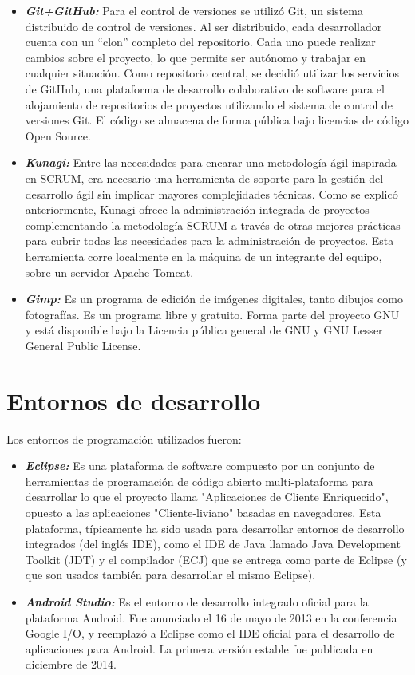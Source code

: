 \begin{itemize}
	\item \emph{\textbf{Git+GitHub:}} Para el control de versiones se utilizó Git, un sistema distribuido de control de versiones. Al ser distribuido,   cada desarrollador cuenta con un “clon” completo del repositorio. Cada uno puede realizar cambios sobre el proyecto, lo que permite ser autónomo y trabajar en cualquier situación. Como repositorio central, se decidió utilizar los servicios de GitHub, una plataforma de desarrollo colaborativo de software para el alojamiento de repositorios de proyectos   utilizando el sistema de control de versiones Git. El código se   almacena de forma pública bajo licencias de código Open   Source.  
	\item \emph{\textbf{Kunagi:}} Entre las necesidades para encarar una metodología ágil inspirada en SCRUM, era necesario una herramienta de   soporte para la gestión del desarrollo ágil sin implicar mayores complejidades técnicas. Como se explicó anteriormente,  Kunagi ofrece la administración integrada de proyectos complementando la metodología SCRUM a través de otras mejores prácticas para cubrir todas las necesidades para la   administración de proyectos. Esta herramienta corre     localmente en la máquina de un integrante del equipo, sobre un  servidor  Apache  Tomcat. 
	\item \emph{\textbf{Gimp:}} Es un programa de edición de imágenes digitales, tanto dibujos como fotografías. Es un programa libre y gratuito. Forma parte del proyecto GNU y está disponible bajo la Licencia pública general de GNU y GNU Lesser General Public License.

\end{itemize}
	
\section{Entornos de desarrollo}	
Los  entornos  de  programación  utilizados  fueron: 

\begin{itemize}
	\item \emph{\textbf{Eclipse:}} Es una plataforma de software compuesto por un conjunto de herramientas de programación de código abierto multi-plataforma para desarrollar lo que el proyecto llama "Aplicaciones de Cliente Enriquecido", opuesto a las aplicaciones "Cliente-liviano" basadas en navegadores. 
	Esta plataforma, típicamente ha sido usada para desarrollar entornos de desarrollo integrados (del inglés IDE), como el IDE de Java llamado Java Development Toolkit (JDT) y el compilador (ECJ) que se entrega como parte de Eclipse (y que son usados también para desarrollar el mismo Eclipse).\cite{eclipse}
 	
 	\item \emph{\textbf{Android Studio:}} Es el entorno de desarrollo integrado oficial para la plataforma Android. Fue anunciado el 16 de mayo de 2013 en la conferencia Google I/O, y reemplazó a Eclipse como el IDE oficial para el desarrollo de aplicaciones para Android. La primera versión estable fue publicada en diciembre de 2014. \cite{astudio}
\end{itemize}


